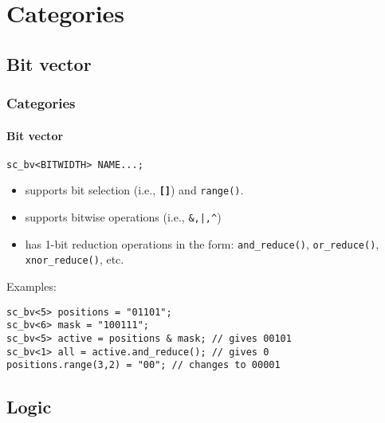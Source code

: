 \section{Categories}

\subsection{Bit vector}

\begin{frame}[fragile]
\frametitle{Categories}
\framesubtitle{Bit vector}

\begin{block}{\texttt{sc\_bv<BITWIDTH> NAME...;}}
\begin{itemize}
\item supports bit selection (i.e., {\bfseries \texttt{[]}}) and \texttt{range()}.
\item supports bitwise operations (i.e., \verb+&,|,^+)
\item has 1-bit reduction operations in the form: \texttt{and\_reduce()}, \texttt{or\_reduce()}, \texttt{xnor\_reduce()}, etc.
\end{itemize}
\end{block}
\pause
\begin{block}{Examples:} 
\vspace{-1em}
\begin{verbatim}
sc_bv<5> positions = "01101";
sc_bv<6> mask = "100111";
sc_bv<5> active = positions & mask; // gives 00101
sc_bv<1> all = active.and_reduce(); // gives 0
positions.range(3,2) = "00"; // changes to 00001
\end{verbatim}
\vspace{-1em}
\end{block}

\end{frame}

\subsection{Logic}

